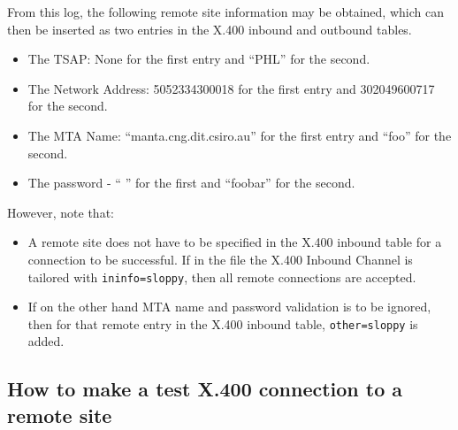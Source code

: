 
From this log, the following remote site information may be obtained,
which can then be inserted as two entries in the X.400 inbound and
outbound tables.

\begin{itemize}
\item The TSAP:  None for the first entry and ``PHL'' for the second.

\item The Network Address: 5052334300018 for the first entry and 
302049600717 for the second.

\item The MTA Name: ``manta.cng.dit.csiro.au'' for the first entry and 
``foo'' for the second.

\item The password - `` '' for the first and ``foobar'' for the second.
\end{itemize}

However, note that:

\begin{itemize}

\item A remote site does not have to be specified in the X.400 inbound table
for a connection to be successful.  If in the  file the
X.400 Inbound Channel is tailored with \verb|ininfo=sloppy|, then all
remote connections are accepted.

\item If on the other hand MTA name and password validation is to 
be ignored, then for that remote entry in the X.400 inbound table, 
\verb|other=sloppy| is added. 
\end{itemize}

\subsection {How to make a test X.400 connection to a remote site}

